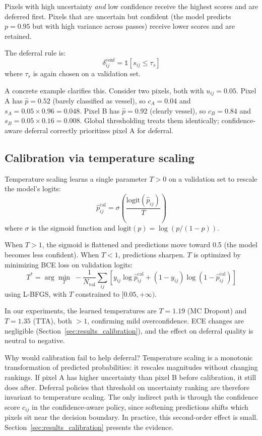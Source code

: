 Pixels with high uncertainty \emph{and} low confidence receive the highest
scores and are deferred first. Pixels that are uncertain but confident
(the model predicts $p = 0.95$ but with high variance across passes)
receive lower scores and are retained.

The deferral rule is:
\begin{equation}
  \delta_{ij}^{\text{conf}} = \mathbb{1}[s_{ij} \leq \tau_s]
  \label{eq:conf_deferral}
\end{equation}
where $\tau_s$ is again chosen on a validation set.

A concrete example clarifies this. Consider two pixels, both with
$u_{ij} = 0.05$. Pixel A has $\hat{p} = 0.52$ (barely classified as
vessel), so $c_A = 0.04$ and $s_A = 0.05 \times 0.96 = 0.048$. Pixel B
has $\hat{p} = 0.92$ (clearly vessel), so $c_B = 0.84$ and
$s_B = 0.05 \times 0.16 = 0.008$. Global thresholding treats them
identically; confidence-aware deferral correctly prioritizes pixel A
for deferral.

\subsection{Calibration via temperature scaling}
\label{sec:calibration}

Temperature scaling \citep{guo2017calibration} learns a single parameter
$T > 0$ on a validation set to rescale the model's logits:
\begin{equation}
  \hat{p}_{ij}^{\text{cal}} = \sigma\left(\frac{\text{logit}(\hat{p}_{ij})}{T}\right)
  \label{eq:temp_scaling}
\end{equation}
where $\sigma$ is the sigmoid function and $\text{logit}(p) = \log(p / (1-p))$.

When $T > 1$, the sigmoid is flattened and predictions move toward 0.5
(the model becomes less confident). When $T < 1$, predictions sharpen.
$T$ is optimized by minimizing BCE loss on validation logits:
\begin{equation}
  T^* = \arg\min_T \; -\frac{1}{N_{\text{val}}} \sum_{ij}
  \left[ y_{ij} \log \hat{p}_{ij}^{\text{cal}} +
  (1 - y_{ij}) \log (1 - \hat{p}_{ij}^{\text{cal}}) \right]
  \label{eq:temp_opt}
\end{equation}
using L-BFGS, with $T$ constrained to $[0.05, +\infty)$.

In our experiments, the learned temperatures are $T = 1.19$ (MC Dropout) and
$T = 1.35$ (TTA), both $> 1$, confirming mild overconfidence. ECE changes
are negligible (Section~\ref{sec:results_calibration}), and the effect on
deferral quality is neutral to negative.

Why would calibration fail to help deferral? Temperature scaling is a
monotonic transformation of predicted probabilities: it rescales magnitudes
without changing rankings. If pixel A has higher uncertainty than pixel B
before calibration, it still does after. Deferral policies that threshold on
uncertainty ranking are therefore invariant to temperature scaling. The only
indirect path is through the confidence score $c_{ij}$ in the
confidence-aware policy, since softening predictions shifts which pixels sit
near the decision boundary. In practice, this second-order effect is small.
Section~\ref{sec:results_calibration} presents the evidence.
